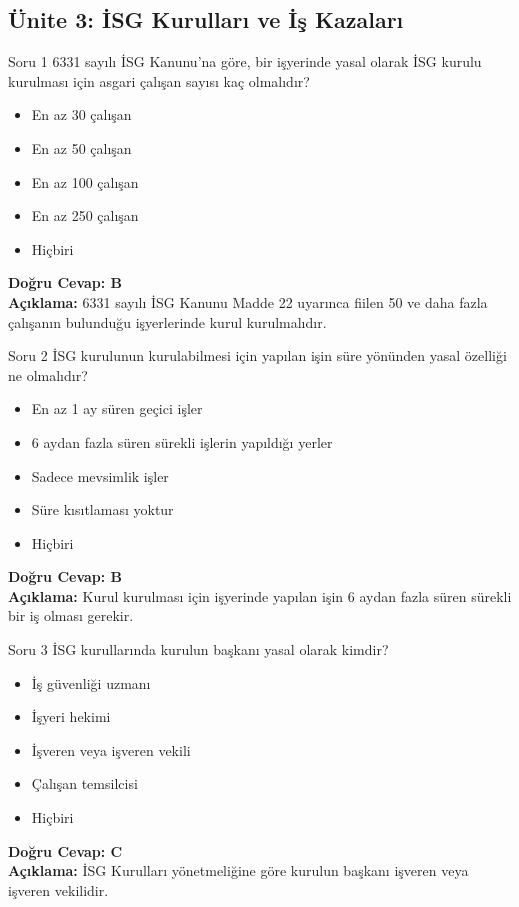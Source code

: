 \documentclass[12pt,a4paper]{article}
\begin{document}
\subsection{Ünite 3: İSG Kurulları ve İş Kazaları}
\begin{testcard}{Soru 1}
    6331 sayılı İSG Kanunu'na göre, bir işyerinde yasal olarak İSG kurulu kurulması için asgari çalışan sayısı kaç olmalıdır?
    \begin{itemize}
        \item[A)] En az 30 çalışan
        \item[B)] En az 50 çalışan
        \item[C)] En az 100 çalışan
        \item[D)] En az 250 çalışan
        \item[E)] Hiçbiri
    \end{itemize}
    \tcblower
    \textbf{Doğru Cevap: B} \\
    \textbf{Açıklama:} 6331 sayılı İSG Kanunu Madde 22 uyarınca fiilen 50 ve daha fazla çalışanın bulunduğu işyerlerinde kurul kurulmalıdır.
\end{testcard}

\begin{testcard}{Soru 2}
    İSG kurulunun kurulabilmesi için yapılan işin süre yönünden yasal özelliği ne olmalıdır?
    \begin{itemize}
        \item[A)] En az 1 ay süren geçici işler
        \item[B)] 6 aydan fazla süren sürekli işlerin yapıldığı yerler
        \item[C)] Sadece mevsimlik işler
        \item[D)] Süre kısıtlaması yoktur
        \item[E)] Hiçbiri
    \end{itemize}
    \tcblower
    \textbf{Doğru Cevap: B} \\
    \textbf{Açıklama:} Kurul kurulması için işyerinde yapılan işin 6 aydan fazla süren sürekli bir iş olması gerekir.
\end{testcard}

\begin{testcard}{Soru 3}
    İSG kurullarında kurulun başkanı yasal olarak kimdir?
    \begin{itemize}
        \item[A)] İş güvenliği uzmanı
        \item[B)] İşyeri hekimi
        \item[C)] İşveren veya işveren vekili
        \item[D)] Çalışan temsilcisi
        \item[E)] Hiçbiri
    \end{itemize}
    \tcblower
    \textbf{Doğru Cevap: C} \\
    \textbf{Açıklama:} İSG Kurulları yönetmeliğine göre kurulun başkanı işveren veya işveren vekilidir.
\end{testcard}
\end{document}
